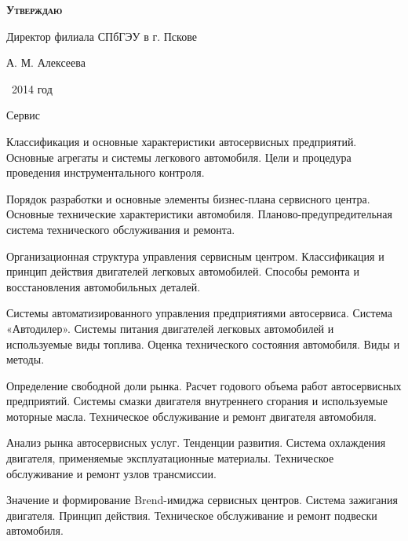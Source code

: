 \documentclass[
	11pt,
	a4paper,
	]
	{article}
\begin{document}
\newlength{\pblength}\settowidth{\pblength}{Директор филиала СПбГЭУ в г. Пскове}

\hfill\parbox{\pblength}{
	\textbf{\textsc{Утверждаю}}\medskip

	Директор филиала СПбГЭУ в г. Пскове\medskip

	\makebox[3cm]{\hrulefill} А. М. Алексеева\medskip

	\makebox[1.5cm]{<<\hrulefill>>} \makebox[3cm]{\hrulefill}\ 2014 год
}


 {Сервис}

	

\noindent{} 
	{
		Классификация и основные характеристики автосервисных предприятий.
	}{
		Основные агрегаты и системы легкового автомобиля.
	}{
		Цели и процедура проведения инструментального контроля.
	}

\bigskip

\noindent{} 
	{
		Порядок разработки и основные элементы бизнес-плана сервисного центра.
	}{
		Основные технические характеристики автомобиля.
	}{
		Планово-предупредительная система технического обслуживания и ремонта.
	}

\bigskip

\noindent{} 
	{
		Организационная структура управления сервисным центром.
	}{
		Классификация и принцип действия двигателей легковых автомобилей.
	}{
		Способы ремонта и восстановления автомобильных деталей.
	}

\bigskip

\noindent{} 
	{
		Системы автоматизированного управления предприятиями автосервиса. Система «Автодилер».
	}{
		Системы питания двигателей легковых автомобилей и используемые виды топлива.
	}{
		Оценка технического состояния автомобиля. Виды и методы.
	}

\bigskip

\noindent{} 
	{
		Определение свободной доли рынка. Расчет годового объема работ автосервисных предприятий.
	}{
		Системы смазки двигателя внутреннего сгорания и используемые моторные масла.
	}{
		Техническое обслуживание и ремонт двигателя автомобиля.
	}

\bigskip

\noindent{} 
	{
		Анализ рынка автосервисных услуг. Тенденции развития.
	}{
		Система охлаждения двигателя, применяемые эксплуатационные материалы.
	}{
		Техническое обслуживание и ремонт узлов трансмиссии.
	}

\bigskip

\noindent{} 
	{
		Значение и формирование Brend-имиджа сервисных центров.
	}{
		Система зажигания двигателя. Принцип действия.
	}{
		Техническое обслуживание и ремонт подвески автомобиля.
	}
\end{document}
